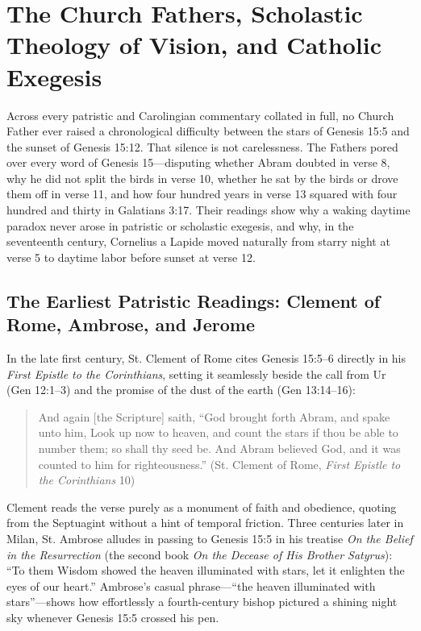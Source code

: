 \section{The Church Fathers, Scholastic Theology of Vision, and Catholic Exegesis}

Across every patristic and Carolingian commentary collated in full, no Church Father ever raised a chronological difficulty between the stars of Genesis 15:5 and the sunset of Genesis 15:12. That silence is not carelessness. The Fathers pored over every word of Genesis 15---disputing whether Abram doubted in verse 8, why he did not split the birds in verse 10, whether he sat by the birds or drove them off in verse 11, and how four hundred years in verse 13 squared with four hundred and thirty in Galatians 3:17. Their readings show why a waking daytime paradox never arose in patristic or scholastic exegesis, and why, in the seventeenth century, Cornelius a Lapide moved naturally from starry night at verse 5 to daytime labor before sunset at verse 12.

\subsection{The Earliest Patristic Readings: Clement of Rome, Ambrose, and Jerome}

In the late first century, St. Clement of Rome cites Genesis 15:5--6 directly in his \emph{First Epistle to the Corinthians}, setting it seamlessly beside the call from Ur (Gen 12:1--3) and the promise of the dust of the earth (Gen 13:14--16):

\begin{quote}
And again [the Scripture] saith, ``God brought forth Abram, and spake unto him, Look up now to heaven, and count the stars if thou be able to number them; so shall thy seed be. And Abram believed God, and it was counted to him for righteousness.'' (St. Clement of Rome, \emph{First Epistle to the Corinthians} 10)
\end{quote}

Clement reads the verse purely as a monument of faith and obedience, quoting from the Septuagint without a hint of temporal friction. Three centuries later in Milan, St. Ambrose alludes in passing to Genesis 15:5 in his treatise \emph{On the Belief in the Resurrection} (the second book \emph{On the Decease of His Brother Satyrus}): ``To them Wisdom showed the heaven illuminated with stars, let it enlighten the eyes of our heart.'' Ambrose's casual phrase---``the heaven illuminated with stars''---shows how effortlessly a fourth-century bishop pictured a shining night sky whenever Genesis 15:5 crossed his pen.

